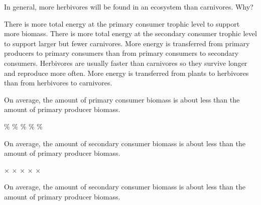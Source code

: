 


\question
In general, more herbivores will be found in an ecosystem than carnivores. Why?

\begin{choices}
\correctchoice There is more total energy at the primary consumer trophic level to support more biomass.%
\choice There is more total energy at the secondary consumer trophic level to support larger but fewer carnivores.%
\choice More energy is transferred from primary producers to primary consumers than from primary consumers to secondary consumers.%
\choice Herbivores are usually faster than carnivores so they survive longer and reproduce more often.%
\choice More energy is transferred from plants to herbivores than from herbivores to carnivores.%
\end{choices}


\question
On average, the amount of primary consumer biomass is about \underline{\hspace{2cm}} less than the amount of primary producer biomass.

\begin{choices}
\% %
\% %
\% %
\% %
\% %
\end{choices}


\question
On average, the amount of secondary consumer biomass is about \underline{\hspace{2cm}} less than the amount of primary producer biomass. 
\begin{choices}
$\times$ %
$\times$ %
$\times$ %
$\times$ %
$\times$ %
\end{choices}

\question
On average, the amount of secondary consumer biomass is about \underline{\hspace{2cm}} less than the amount of primary producer biomass. 
\begin{choices}
\times %
\times %
\times %
\times %
\times %
\end{choices}


